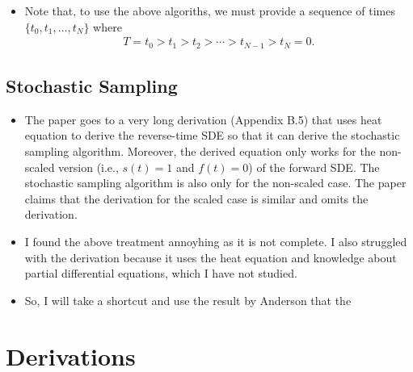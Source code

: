\documentclass[10pt]{article}
\begin{document}
\begin{itemize}
  \item Note that, to use the above algoriths, we must provide a sequence of times $\{ t_0, t_1, \dotsc, t_N \}$ where
  \begin{align*}
    T = t_0 > t_1 > t_2 > \dotsb > t_{N-1} > t_N = 0.
  \end{align*}
\end{itemize}

\subsection{Stochastic Sampling}

\begin{itemize}
  \item The paper goes to a very long derivation (Appendix B.5) that uses heat equation to derive the reverse-time SDE \cite{Anderson:1982} so that it can derive the stochastic sampling algorithm. Moreover, the derived equation only works for the non-scaled version (i.e., $s(t) = 1$ and $f(t) = 0$) of the forward SDE. The stochastic sampling algorithm is also only for the non-scaled case. The paper claims that the derivation for the scaled case is similar and omits the derivation.
  
  \item I found the above treatment annoyhing as it is not complete. I also struggled with the derivation because it uses the heat equation and knowledge about partial differential equations, which I have not studied.
  
  \item So, I will take a shortcut and use the result by Anderson that the  
\end{itemize}

\appendix

\section{Derivations}
\end{document}
